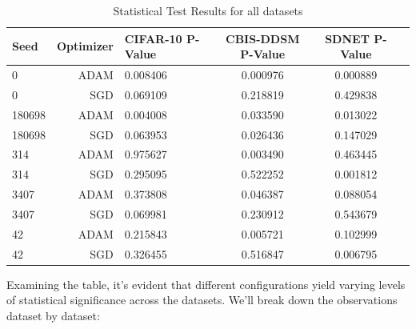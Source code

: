 \begin{table}[h!]
      \centering
      \caption{Statistical Test Results for all datasets}
      \label{tab:stat_results}
      \begin{tabular}{|l|r|l|c|c|c|}
      \toprule
      \textbf{Seed} & \textbf{Optimizer} & \textbf{CIFAR-10 P-Value} & \textbf{CBIS-DDSM P-Value} & \textbf{SDNET P-Value} \\
      \hline
       0 & ADAM & \cellcolor{myred} 0.008406 & \cellcolor{myred} 0.000976 & \cellcolor{myred} 0.000889 \\
      \hline
       0 & SGD & \cellcolor{myyellow} 0.069109 & \cellcolor{mygreen} 0.218819 & \cellcolor{mygreen} 0.429838 \\
      \hline
      180698 & ADAM & \cellcolor{myred} 0.004008 & \cellcolor{myred} 0.033590 & \cellcolor{myred} 0.013022 \\
      \hline
       180698 & SGD & \cellcolor{myyellow} 0.063953 & \cellcolor{myred} 0.026436 & \cellcolor{mygreen} 0.147029 \\
      \hline
       314 & ADAM & \cellcolor{mygreen} 0.975627 & \cellcolor{myred} 0.003490 & \cellcolor{mygreen} 0.463445 \\
      \hline
       314 & SGD & \cellcolor{mygreen} 0.295095 & \cellcolor{mygreen} 0.522252 & \cellcolor{myred} 0.001812 \\
      \hline
       3407 & ADAM & \cellcolor{mygreen} 0.373808 & \cellcolor{myred} 0.046387 & \cellcolor{myyellow} 0.088054 \\
      \hline
       3407 & SGD & \cellcolor{myyellow} 0.069981 & \cellcolor{mygreen} 0.230912 & \cellcolor{mygreen} 0.543679 \\
      \hline
       42 & ADAM & \cellcolor{mygreen} 0.215843 & \cellcolor{myred} 0.005721 & \cellcolor{mygreen} 0.102999 \\
      \hline
       42 & SGD & \cellcolor{mygreen} 0.326455 & \cellcolor{mygreen} 0.516847 & \cellcolor{myred} 0.006795 \\
      \hline
      \end{tabular}
\end{table}


Examining the table, it's evident that different configurations yield varying levels of statistical significance across the datasets. We'll break down the observations dataset by dataset:


